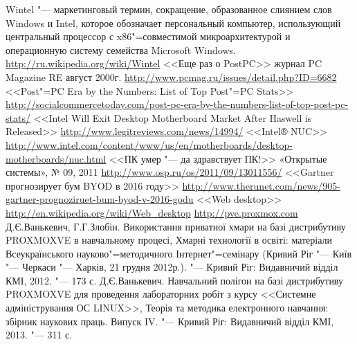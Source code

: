 \documentclass[10pt, a5paper]{article}
\begin{document}
\begin{thebibliography}{9}
 Wintel "--- маркетинговый термин, сокращение, образованное слиянием слов Windows и Intel, которое обозначает персональный компьютер, использующий центральный процессор с x86"=совместимой микроархитектурой и операционную систему семейства Microsoft Windows. \url{http://ru.wikipedia.org/wiki/Wintel}
 <<Еще раз о PostPC>> журнал PC Magazine RE август 2000г. \url{http://www.pcmag.ru/issues/detail.php?ID=6682}
 <<Post"=PC Era by the Numbers: List of Top Post"=PC Stats>> \url{http://socialcommercetoday.com/post-pc-era-by-the-numbers-list-of-top-post-pc-stats/}
 <<Intel Will Exit Desktop Motherboard Market After Haswell is Released>> \url{http://www.legitreviews.com/news/14994/}
 <<Intel® NUC>> \url{http://www.intel.com/content/www/us/en/motherboards/desktop-motherboards/nuc.html}
 <<ПК умер "--- да здравствует ПК!>> «Открытые системы», № 09, 2011 \url{http://www.osp.ru/os/2011/09/13011556/}
 <<Gartner прогнозирует бум BYOD в 2016 году>> \url{http://www.therunet.com/news/905-gartner-prognoziruet-bum-byod-v-2016-godu}
 <<Web desktop>> \url{http://en.wikipedia.org/wiki/Web\_desktop}
 \url{http://pve.proxmox.com}
 Д.Є.Ванькевич, Г.Г.Злобін. Використання приватної хмари на базі дистрибутиву PROXMOXVE в навчальному процесі, Хмарні технології в освіті: матеріали Всеукраїнського науково"=методичного Інтернет"=семінару (Кривий Ріг "--- Київ "--- Черкаси "--- Харків, 21 грудня 2012р.). "--- Кривий Ріг: Видавничий відділ КМІ, 2012. "--- 173 с.
 Д.Є.Ванькевич. Навчальний полігон на базі дистрибутиву PROXMOXVE для проведення лабораторних робіт з курсу <<Системне адміністрування ОС LINUX>>, Теорія та методика електронного навчання: збірник наукових праць. Випуск IV. "--- Кривий Ріг: Видавничий відділ КМІ, 2013. "--- 311 с.
\end{thebibliography}
\end{document}
